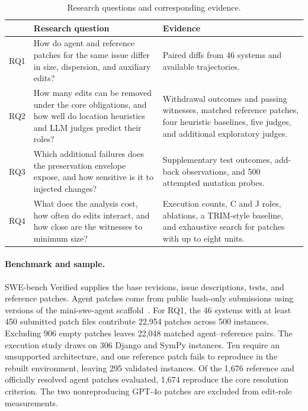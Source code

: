 \documentclass[a4paper,fleqn]{cas-sc}
\newcommand{\lab}[1]{\textsf{#1}}
\begin{document}
\begin{table}[pos=htbp]
\caption{Research questions and corresponding evidence.}
\label{tab:rqs}
\small\centering
\begin{tabularx}{\linewidth}{lXX}
\toprule
 & Research question & Evidence \\
\midrule
RQ1 & How do agent and reference patches for the same issue differ in size, dispersion, and auxiliary edits? & Paired diffs from 46 systems and available trajectories. \\
RQ2 & How many edits can be removed under the core obligations, and how well do location heuristics and LLM judges predict their roles? & Withdrawal outcomes and passing witnesses, matched reference patches, four heuristic baselines, five judges, and additional exploratory judges. \\
RQ3 & Which additional failures does the preservation envelope expose, and how sensitive is it to injected changes? & Supplementary test outcomes, add-back observations, and 500 attempted mutation probes. \\
RQ4 & What does the analysis cost, how often do edits interact, and how close are the witnesses to minimum size? & Execution counts, \lab{C} and \lab{J} roles, ablations, a TRIM-style baseline, and exhaustive search for patches with up to eight units. \\
\bottomrule
\end{tabularx}
\end{table}

\paragraph{Benchmark and sample.} SWE-bench Verified supplies the base revisions, issue descriptions, tests, and reference patches. Agent patches come from public bash-only submissions using versions of the mini-swe-agent scaffold~\citep{miniswe2025}. For RQ1, the 46 systems with at least 450 submitted patch files contribute 22,954 patches across 500 instances. Excluding 906 empty patches leaves 22,048 matched agent--reference pairs. The execution study draws on 306 Django and SymPy instances. Ten require an unsupported architecture, and one reference patch fails to reproduce in the rebuilt environment, leaving 295 validated instances. Of the 1,676 reference and officially resolved agent patches evaluated, 1,674 reproduce the core resolution criterion. The two nonreproducing GPT-4o patches are excluded from edit-role measurements.
\end{document}
